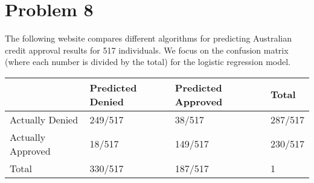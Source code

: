 \documentclass{article}
\begin{document}
\pagebreak

\section*{Problem 8}
The following website compares different algorithms for predicting Australian credit
approval results for 517 individuals. We focus on the confusion matrix (where each number is
divided by the total) for the logistic regression model.

\begin{tabular}{|l|l|l|l|}
    \hline
    & Predicted Denied & Predicted Approved & Total \\
    \hline
    Actually Denied & 249/517 & 38/517 & 287/517 \\
    \hline
    Actually Approved & 18/517 & 149/517 & 230/517 \\
    \hline
    Total & 330/517 & 187/517 & 1 \\
    \hline
\end{tabular}
\end{document}

